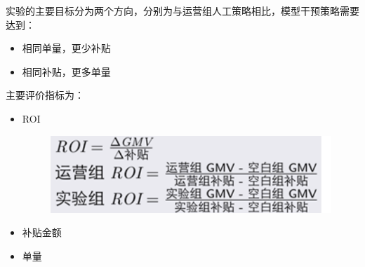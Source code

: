 \documentclass[12pt]{article}
\begin{document}
实验的主要目标分为两个方向，分别为与运营组人工策略相比，模型干预策略需要达到：
\begin{itemize}
\setlength{\itemsep}{0pt}
\setlength{\parsep}{0pt}
\setlength{\parskip}{0pt}
    \item 相同单量，更少补贴
    \item 相同补贴，更多单量
\end{itemize}

主要评价指标为：
\begin{itemize}
\setlength{\itemsep}{0pt}
\setlength{\parsep}{0pt}
\setlength{\parskip}{0pt}
    \item ROI
    \begin{figure}[H]
    \centering
    \includegraphics[width=.4\textwidth]{fig/Casual_Inference_In_Didi_18.png}
\end{figure}
    \item 补贴金额
    \item 单量
\end{itemize}
\end{document}
